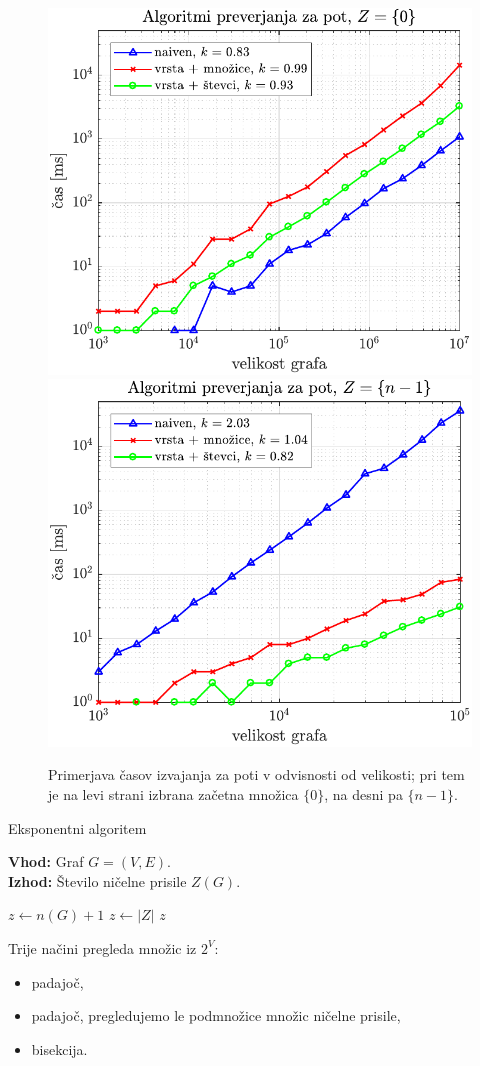 \documentclass{beamer}
\begin{document}
\begin{frame}{}
    \begin{figure}
        \centering
        \includegraphics[width=0.49\linewidth]{../koda/results/plots/pot_prvo_vozlisce.pdf}
        \includegraphics[width=0.49\linewidth]{../koda/results/plots/pot_zadnje_vozlisce.pdf}
        \caption{Primerjava časov izvajanja za poti v odvisnosti od velikosti; pri tem je na levi strani izbrana začetna množica $\{ 0 \}$, na desni pa $\{n-1\}$.}
    \end{figure}
\end{frame}

\begin{frame}{Eksponentni algoritem}
    \begin{algorithm}[H]
        \caption{}
        \raggedright
        \textbf{Vhod:} Graf $G = (V,E)$. \\
        \textbf{Izhod:} Število ničelne prisile $Z(G)$.
        \begin{algorithmic}[1]
            \State $z \gets n(G)+1$
            \State $z \gets |Z|$
            \EndIf
            \EndFor
            \State \Return $z$
        \end{algorithmic}
    \end{algorithm}
\end{frame}

\begin{frame}
    Trije načini pregleda množic iz $2^V$:
    \begin{itemize}
        \item padajoč,
        \item padajoč, pregledujemo le podmnožice množic ničelne prisile,
        \item bisekcija.
    \end{itemize}
\end{frame}
\end{document}
